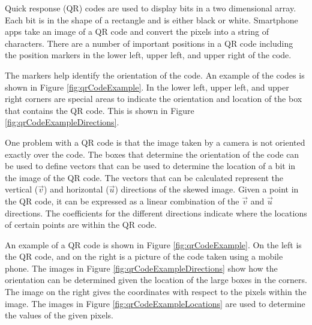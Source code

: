 \clearpage
\begin{exercise} %
  \label{exercise:QRCode}

  Quick response (QR) codes are used to display bits in a two
  dimensional array. Each bit is in the shape of a rectangle and is
  either black or white. Smartphone apps take an image of a QR code
  and convert the pixels into a string of characters. There are a
  number of important positions in a QR code including the position
  markers in the lower left, upper left, and upper right of the code.

  The markers help identify the orientation of the code. An example of
  the codes is shown in Figure \ref{fig:qrCodeExample}. In the lower
  left, upper left, and upper right corners are special areas to
  indicate the orientation and location of the box that contains the
  QR code. This is shown in Figure
  \ref{fig:qrCodeExampleDirections}.

  One problem with a QR code is that the image taken by a camera is
  not oriented exactly over the code. The boxes that determine the
  orientation of the code can be used to define vectors that can be
  used to determine the location of a bit in the image of the QR
  code. The vectors that can be calculated represent the vertical
  ($\vec{v}$) and horizontal ($\vec{u}$) directions of the skewed
  image. Given a point in the QR code, it can be expressed as a linear
  combination of the $\vec{v}$ and $\vec{u}$ directions. The
  coefficients for the different directions indicate where the
  locations of certain points are within the QR code.

  An example of a QR code is shown in Figure
  \ref{fig:qrCodeExample}. On the left is the QR code, and on the
  right is a picture of the code taken using a mobile phone. The
  images in Figure \ref{fig:qrCodeExampleDirections} show how the
  orientation can be determined given the location of the large boxes
  in the corners. The image on the right gives the coordinates with
  respect to the pixels within the image. The images in Figure
  \ref{fig:qrCodeExampleLocations} are used to determine the values of
  the given pixels.


\end{exercise}
